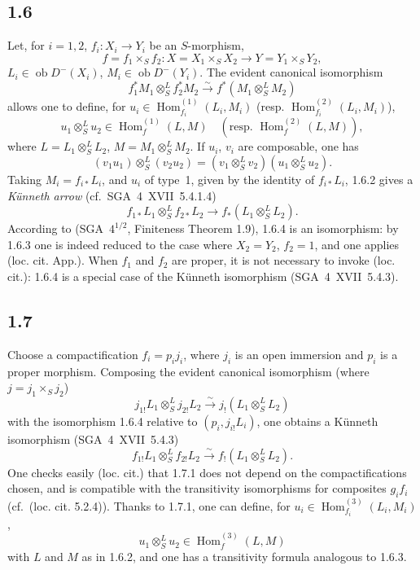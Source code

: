 \documentclass[11pt]{article}
\DeclareMathOperator{\Hom}{Hom}
\newcommand{\ob}{\operatorname{ob}}
\providecommand{\Hom}{\operatorname{Hom}}
\providecommand{\ob}{\operatorname{ob}}
\providecommand{\Hom}{\operatorname{Hom}}
\begin{document}
\subsection*{1.6}
Let, for $i=1,2$, $f_i:X_i\to Y_i$ be an $S$-morphism,
\[
f=f_1\times_Sf_2:X=X_1\times_SX_2\to Y=Y_1\times_SY_2,
\]
$L_i\in\ob D^{-}(X_i)$, $M_i\in\ob D^{-}(Y_i)$. The evident canonical isomorphism
\begin{equation}\tag{1.6.1}
f_1^{*}M_1\otimes^L_Sf_2^{*}M_2\xrightarrow{\sim}f^{*}(M_1\otimes^L_SM_2)
\end{equation}
allows one to define, for $u_i\in\Hom_{f_i}^{(1)}(L_i,M_i)$ (resp. $\Hom_{f_i}^{(2)}(L_i,M_i)$),
\begin{equation}\tag{1.6.2}
u_1\otimes^L_Su_2\in\Hom_f^{(1)}(L,M)\quad(\text{resp. }\Hom_f^{(2)}(L,M)),
\end{equation}
where $L=L_1\otimes^L_SL_2$, $M=M_1\otimes^L_SM_2$. If $u_i$, $v_i$ are composable, one has
\begin{equation}\tag{1.6.3}
(v_1u_1)\otimes^L_S(v_2u_2)=(v_1\otimes^L_Sv_2)(u_1\otimes^L_Su_2).
\end{equation}
Taking $M_i=f_{i*}L_i$, and $u_i$ of type~1, given by the identity of $f_{i*}L_i$, 1.6.2 gives a \emph{Künneth arrow} (cf.~SGA~4~XVII~5.4.1.4)
\begin{equation}\tag{1.6.4}
f_{1*}L_1\otimes^L_Sf_{2*}L_2\longrightarrow f_{*}(L_1\otimes^L_SL_2).
\end{equation}
According to (SGA~$4^{1/2}$, Finiteness Theorem 1.9), 1.6.4 is an isomorphism: by 1.6.3 one is indeed reduced to the case where $X_2=Y_2$, $f_2=1$, and one applies (loc. cit. App.). When $f_1$ and $f_2$ are proper, it is not necessary to invoke (loc. cit.): 1.6.4 is a special case of the Künneth isomorphism (SGA~4~XVII~5.4.3).

\subsection*{1.7}
Choose a compactification $f_i=p_i j_i$, where $j_i$ is an open immersion and $p_i$ is a proper morphism. Composing the evident canonical isomorphism (where $j=j_1\times_Sj_2$)
\[
j_{1!}L_1\otimes^L_Sj_{2!}L_2\xrightarrow{\sim}j_{!}(L_1\otimes^L_SL_2)
\]
with the isomorphism 1.6.4 relative to $(p_i,j_{i!}L_i)$, one obtains a Künneth isomorphism (SGA~4~XVII~5.4.3)
\begin{equation}\tag{1.7.1}
f_{1!}L_1\otimes^L_Sf_{2!}L_2\xrightarrow{\sim}f_{!}(L_1\otimes^L_SL_2).
\end{equation}
One checks easily (loc. cit.) that 1.7.1 does not depend on the compactifications chosen, and is compatible with the transitivity isomorphisms for composites $g_if_i$ (cf.~(loc. cit. 5.2.4)). Thanks to 1.7.1, one can define, for $u_i\in\Hom_{f_i}^{(3)}(L_i,M_i)$,
\begin{equation}\tag{1.7.2}
u_1\otimes^L_Su_2\in\Hom_f^{(3)}(L,M)
\end{equation}
with $L$ and $M$ as in 1.6.2, and one has a transitivity formula analogous to 1.6.3.
\end{document}
